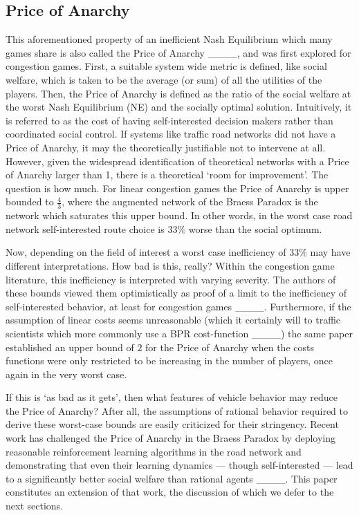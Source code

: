 \subsection{Price of Anarchy}

This aforementioned property of an inefficient Nash Equilibrium which many games share is also called the Price of Anarchy ____, and was first explored for congestion games. First, a suitable system wide metric is defined, like social welfare, which is taken to be the average (or sum) of all the utilities of the players. Then, the Price of Anarchy is defined as the ratio of the social welfare at the worst Nash Equilibrium (NE) and the socially optimal solution. Intuitively, it is referred to as the cost of having self-interested decision makers rather than coordinated social control. If systems like traffic road networks did not have a Price of Anarchy, it may the theoretically justifiable not to intervene at all. However, given the widespread identification of theoretical networks with a Price of Anarchy larger than 1, there is a theoretical `room for improvement'. The question is how much. For linear congestion games the Price of Anarchy is upper bounded to $\frac{4}{3}$, where the augmented network of the Braess Paradox is the network which saturates this upper bound. In other words, in the worst case road network self-interested route choice is $33\%$ worse than the social optimum.

Now, depending on the field of interest a worst case inefficiency of $33\%$ may have different interpretations. How bad is this, really? Within the congestion game literature, this inefficiency is interpreted with varying severity. The authors of these bounds viewed them optimistically as proof of a limit to the inefficiency of self-interested behavior, at least for congestion games ____. Furthermore, if the assumption of linear costs seems unreasonable (which it certainly will to traffic scientists which more commonly use a BPR cost-function ____) the same paper established an upper bound of $2$ for the Price of Anarchy when the costs functions were only restricted to be increasing in the number of players, once again in the very worst case.

If this is `as bad as it gets', then what features of vehicle behavior may reduce the Price of Anarchy? After all, the assumptions of rational behavior required to derive these worst-case bounds are easily criticized for their stringency. Recent work has challenged the Price of Anarchy in the Braess Paradox by deploying reasonable reinforcement learning algorithms in the road network and demonstrating that even their learning dynamics --- though self-interested --- lead to a significantly better social welfare than rational agents ____. This paper constitutes an extension of that work, the discussion of which we defer to the next sections.

